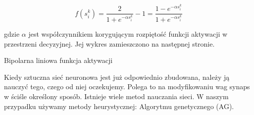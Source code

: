 \documentclass[12pt,a4paper]{article}
\begin{document}
\begin{equation*}
    f(s^k_i) = \frac{2}{1 + e^{-\alpha s^k_i}} - 1 = \frac{1 - e^{-\alpha s^k_i}}{1 + e^{-\alpha s^k_i}}
\end{equation*}

\noindent gdzie $\alpha$ jest współczynnikiem korygującym rozpiętość funkcji aktywacji w przestrzeni decyzyjnej. Jej wykres zamieszczono na następnej stronie.

\begin{center}
    \newline Bipolarna liniowa funkcja aktywacji
\end{center}


Kiedy sztuczna sieć neuronowa jest już odpowiednio zbudowana, należy ją
nauczyć tego, czego od niej oczekujemy.
Polega to na modyfikowaniu wag synaps w ściśle określony sposób.
Istnieje wiele metod nauczania sieci. W naszym przypadku używamy metody heurystycznej: Algorytmu genetycznego (AG).
\end{document}
